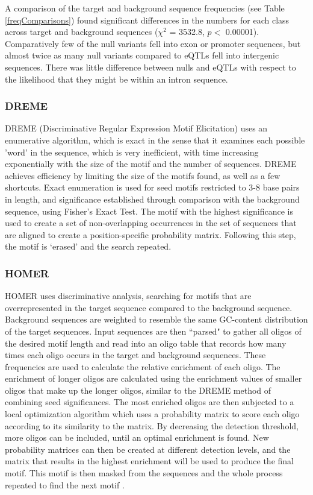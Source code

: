 \documentclass[12pt, onecolumn, oneside]{gsajnl}
\begin{document}
A comparison of the target and background sequence frequencies (see Table \ref{freqComparisons}) found significant differences in the numbers for each class across target and background sequences ($\chi^2$ = 3532.8, $p <$ 0.00001). Comparatively few of the null variants fell into exon or promoter sequences, but almost twice as many null variants compared to eQTLs fell into intergenic sequences. There was little difference between nulls and eQTLs with respect to the likelihood that they might be within an intron sequence.

\subsubsection{DREME\;\;}

DREME (Discriminative Regular Expression Motif Elicitation) \citep{bailey2011dreme} uses an enumerative algorithm, which is exact in the sense that it examines each possible 'word' in the sequence, which is very inefficient, with time increasing exponentially with the size of the motif and the number of sequences. DREME achieves efficiency by limiting the size of the motifs found, as well as a few shortcuts. Exact enumeration is used for seed motifs restricted to 3-8 base pairs in length, and significance established through comparison with the background sequence, using Fisher's Exact Test. The motif with the highest significance is used to create a set of non-overlapping occurrences in the set of sequences that are aligned to create a position-specific probability matrix. Following this step, the motif is `erased' and the search repeated.
 
\subsubsection{HOMER\;\;}

HOMER \citep{heinz2010simple} uses discriminative analysis, searching for motifs that are overrepresented in the target sequence compared to the background sequence. Background sequences are weighted to resemble the same GC-content distribution of the target sequences. Input sequences are then ``parsed" to gather all oligos of the desired motif length and read into an oligo table that records how many times each oligo occurs in the target and background sequences. These frequencies are used to calculate the relative enrichment of each oligo. The enrichment of longer oligos are calculated using the enrichment values of smaller oligos that make up the longer oligos, similar to the DREME method of combining seed significances. The most enriched oligos are then subjected to a local optimization algorithm which uses a probability matrix to score each oligo according to its similarity to the matrix. By decreasing the detection threshold, more oligos can be included, until an optimal enrichment is found. New probability matrices can then be created at different detection levels, and the matrix that results in the highest enrichment will be used to produce the final motif. This motif is then masked from the sequences and the whole process repeated to find the next motif \citep{homer_ws}.
\end{document}
